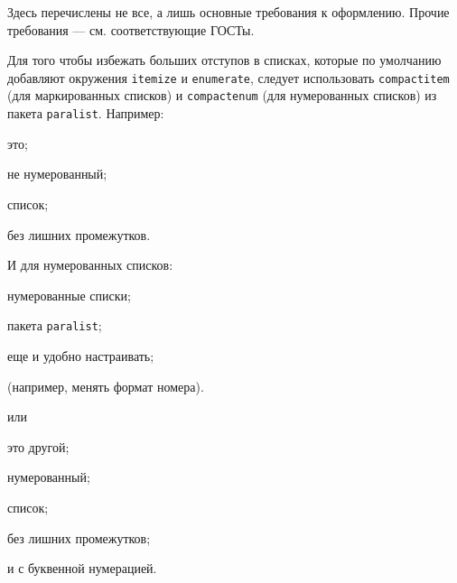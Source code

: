 Здесь перечислены не все, а лишь основные требования к оформлению. Прочие
требования --- см. соответствующие ГОСТы.

Для того чтобы избежать больших отступов в списках, которые по умолчанию добавляют окружения \texttt{itemize} и \texttt{enumerate}, следует использовать
\texttt{compactitem} (для маркированных списков) и \texttt{compactenum} (для нумерованных списков) из пакета \texttt{paralist}.
Например:

\begin{compactitem}
	\item это;
	\item не нумерованный;
	\item список;
	\item без лишних промежутков.
\end{compactitem}

И для нумерованных списков:

\begin{compactenum}[1)]
	\item нумерованные списки;
	\item пакета \texttt{paralist};
	\item еще и удобно настраивать;
	\item (например, менять формат номера).
\end{compactenum}

\noindent или

\begin{compactenum}[a)]
	\item это другой;
	\item нумерованный;
	\item список;
	\item без лишних промежутков;
	\item и с буквенной нумерацией.
\end{compactenum}